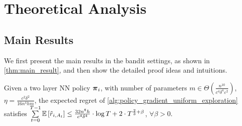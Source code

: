 \section{Theoretical Analysis}
\label{sec:theoretical_analysis}

\subsection{Main Results}
\label{subsec:main_results}

We first present the main results in the bandit settings, as shown in \cref{thm:main_result}, and then show the detailed proof ideas and  intuitions.

\begin{thm}
\label{thm:main_result}
    Given a two layer NN policy ${\boldsymbol{\pi}}_i$, with number of parameters $m \in \Theta\left( \frac{n^{10}}{c^4 \delta^4 \varepsilon^2} \right)$, $\eta = \frac{c^2 \delta^2}{16 n^4 h m}$, the expected regret of \cref{alg:policy_gradient_uniform_exploration} satisfies $\sum\limits_{t=0}^{T-1}{ {\mathbb{E}} \left[ \tilde{r}_{i, A_t} \right] } \le  \frac{32n^8h}{ c^4 \delta^4} \cdot \log{T} + 2 \cdot T^{\frac{2}{3} + \beta }$, $\forall \beta > 0$.
\end{thm}
